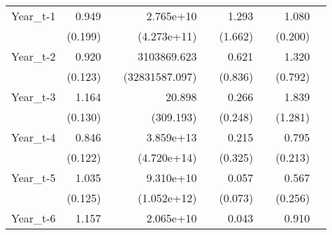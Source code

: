\begin{table}[htbp]
\begin{tabular}{l*{8}{D{.}{.}{-1}}}
Year\_t-1            &       0.949         &                     &   2.765e+10         &                     &       1.293         &                     &       1.080         &                     \\
                    &     (0.199)         &                     & (4.273e+11)         &                     &     (1.662)         &                     &     (0.200)         &                     \\
Year\_t-2            &       0.920         &                     & 3103869.623         &                     &       0.621         &                     &       1.320         &                     \\
                    &     (0.123)         &                     &(32831587.097)         &                     &     (0.836)         &                     &     (0.792)         &                     \\
Year\_t-3            &       1.164         &                     &      20.898         &                     &       0.266         &                     &       1.839         &                     \\
                    &     (0.130)         &                     &   (309.193)         &                     &     (0.248)         &                     &     (1.281)         &                     \\
Year\_t-4            &       0.846         &                     &   3.859e+13\sym{**} &                     &       0.215         &                     &       0.795         &                     \\
                    &     (0.122)         &                     & (4.720e+14)         &                     &     (0.325)         &                     &     (0.213)         &                     \\
Year\_t-5            &       1.035         &                     &   9.310e+10\sym{**} &                     &       0.057\sym{**} &                     &       0.567         &                     \\
                    &     (0.125)         &                     & (1.052e+12)         &                     &     (0.073)         &                     &     (0.256)         &                     \\
Year\_t-6            &       1.157         &                     &   2.065e+10\sym{*}  &                     &       0.043\sym{*}  &                     &       0.910         &                     \\

\end{tabular}
\end{table}
